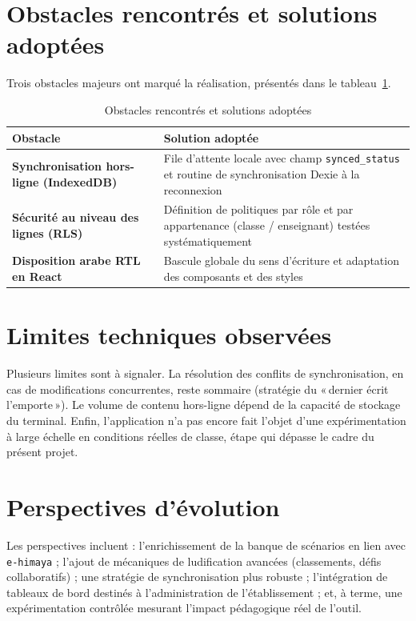 \documentclass[12pt, a4paper, oneside]{report}
\begin{document}
\section{Obstacles rencontrés et solutions adoptées}
Trois obstacles majeurs ont marqué la réalisation, présentés dans le tableau~\ref{tab:obstacles}.

\begin{table}[H]
\centering
\caption{Obstacles rencontrés et solutions adoptées}
\label{tab:obstacles}
\begin{tabularx}{\textwidth}{@{}>{\bfseries}p{} X@{}}
\toprule
Obstacle & Solution adoptée \\
\midrule
Synchronisation hors-ligne (IndexedDB) & File d'attente locale avec champ \texttt{synced\_status} et routine de synchronisation Dexie à la reconnexion \\
Sécurité au niveau des lignes (RLS) & Définition de politiques par rôle et par appartenance (classe / enseignant) testées systématiquement \\
Disposition arabe RTL en React & Bascule globale du sens d'écriture et adaptation des composants et des styles \\
\bottomrule
\end{tabularx}
\end{table}

\section{Limites techniques observées}
Plusieurs limites sont à signaler. La résolution des conflits de synchronisation, en cas de modifications concurrentes, reste sommaire (stratégie du «\,dernier écrit l'emporte\,»). Le volume de contenu hors-ligne dépend de la capacité de stockage du terminal. Enfin, l'application n'a pas encore fait l'objet d'une expérimentation à large échelle en conditions réelles de classe, étape qui dépasse le cadre du présent projet.

\section{Perspectives d'évolution}
Les perspectives incluent : l'enrichissement de la banque de scénarios en lien avec \texttt{e-himaya} ; l'ajout de mécaniques de ludification avancées (classements, défis collaboratifs) ; une stratégie de synchronisation plus robuste ; l'intégration de tableaux de bord destinés à l'administration de l'établissement ; et, à terme, une expérimentation contrôlée mesurant l'impact pédagogique réel de l'outil.
\end{document}
